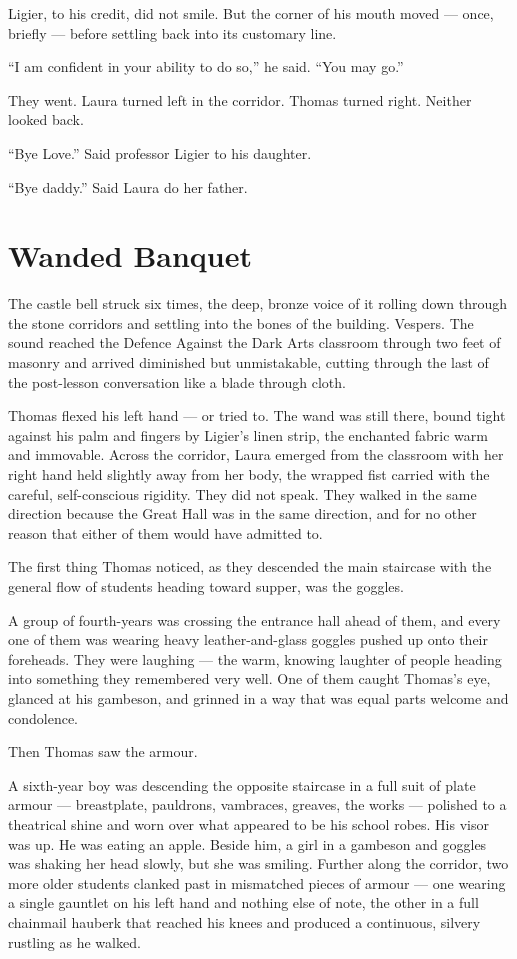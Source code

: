 Ligier, to his credit, did not smile. But the corner of his mouth moved --- once, briefly --- before settling back into its customary line.
 
\enquote{I am confident in your ability to do so,} he said. \enquote{You may go.}
 
They went. Laura turned left in the corridor. Thomas turned right. Neither looked back.
 
 \enquote{Bye Love.} Said professor Ligier to his daughter.
 
 \enquote{Bye daddy.} Said Laura do her father.


\section*{Wanded Banquet}
 
The castle bell struck six times, the deep, bronze voice of it rolling down through the stone corridors and settling into the bones of the building. Vespers. The sound reached the Defence Against the Dark Arts classroom through two feet of masonry and arrived diminished but unmistakable, cutting through the last of the post-lesson conversation like a blade through cloth.
 
Thomas flexed his left hand --- or tried to. The wand was still there, bound tight against his palm and fingers by Ligier's linen strip, the enchanted fabric warm and immovable. Across the corridor, Laura emerged from the classroom with her right hand held slightly away from her body, the wrapped fist carried with the careful, self-conscious rigidity. They did not speak. They walked in the same direction because the Great Hall was in the same direction, and for no other reason that either of them would have admitted to.
 
The first thing Thomas noticed, as they descended the main staircase with the general flow of students heading toward supper, was the goggles.
 
A group of fourth-years was crossing the entrance hall ahead of them, and every one of them was wearing heavy leather-and-glass goggles pushed up onto their foreheads. They were laughing --- the warm, knowing laughter of people heading into something they remembered very well. One of them caught Thomas's eye, glanced at his gambeson, and grinned in a way that was equal parts welcome and condolence.
 
Then Thomas saw the armour.
 
A sixth-year boy was descending the opposite staircase in a full suit of plate armour --- breastplate, pauldrons, vambraces, greaves, the works --- polished to a theatrical shine and worn over what appeared to be his school robes. His visor was up. He was eating an apple. Beside him, a girl in a gambeson and goggles was shaking her head slowly, but she was smiling. Further along the corridor, two more older students clanked past in mismatched pieces of armour --- one wearing a single gauntlet on his left hand and nothing else of note, the other in a full chainmail hauberk that reached his knees and produced a continuous, silvery rustling as he walked.
 

